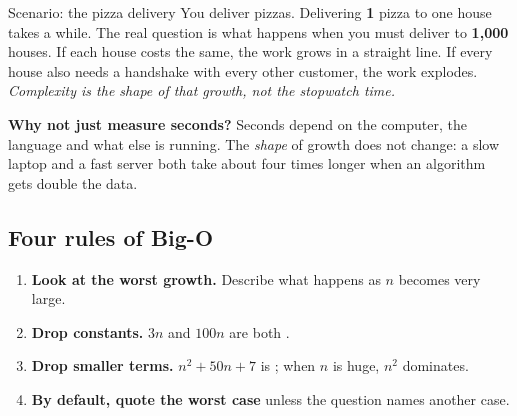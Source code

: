 \documentclass[11pt,a4paper]{article}
\newcommand{\Olin}{\On{n}}
\newcommand{\Osq}{\On{n\textsuperscript{2}}}
\begin{document}
\begin{callout}[teal]{Scenario: the pizza delivery}
You deliver pizzas. Delivering \textbf{1} pizza to one house takes a while. The real question is what happens when you must deliver to \textbf{1,000} houses.
If each house costs the same, the work grows in a straight line. If every house also needs a handshake with every other customer, the work explodes.
\emph{Complexity is the shape of that growth, not the stopwatch time.}
\end{callout}

\textbf{Why not just measure seconds?} Seconds depend on the computer, the language and what else is running. The \emph{shape} of growth does not change: a slow laptop and a fast server both take about four times longer when an \Osq{} algorithm gets double the data.

\begin{center}
\end{center}

\subsection{Four rules of Big-O}
\begin{enumerate}
  \item \textbf{Look at the worst growth.} Describe what happens as $n$ becomes very large.
  \item \textbf{Drop constants.} $3n$ and $100n$ are both \Olin{}.
  \item \textbf{Drop smaller terms.} $n^2 + 50n + 7$ is \Osq{}; when $n$ is huge, $n^2$ dominates.
  \item \textbf{By default, quote the worst case} unless the question names another case.
\end{enumerate}
\end{document}

